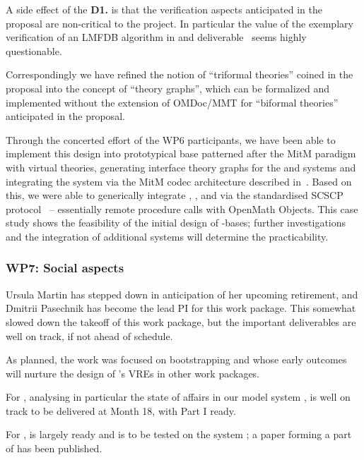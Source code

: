 \documentclass{deliverablereport}
\begin{document}
A side effect of the \textbf{D1.} is that the verification aspects anticipated in the
proposal are non-critical to the \pn project. In particular the value of the exemplary
verification of an LMFDB algorithm in  and
deliverable~ seems highly questionable. 

Correspondingly we have refined the notion of ``triformal theories'' coined in the
proposal into the concept of ``\DKS theory graphs'', which can be formalized and
implemented without the extension of OMDoc/MMT for ``biformal theories'' anticipated in
the proposal.

Through the concerted effort of the WP6 participants, we have been able to implement
this design into prototypical \DKS base patterned after the MitM paradigm with virtual
theories, generating interface theory graphs for the \GAP and \Sage systems and
integrating the \LMFDB system via the MitM codec architecture described
in~\cite{ODK-D6.2}. Based on this, we were able to generically integrate \GAP, \Sage, and
\LMFDB via the standardised SCSCP protocol~\cite{HorRoz:ossp09} -- essentially remote
procedure calls with OpenMath Objects. This case study shows the feasibility of the
initial design of \DKS-bases; further investigations and the integration of additional
systems will determine the practicability.

\subsubsection{WP7: Social aspects}

Ursula Martin has stepped down in anticipation of her upcoming retirement, and Dmitrii Pasechnik has
become the lead PI for this work package.
This somewhat slowed down the takeoff of this work package, but the
important deliverables are well on track, if not ahead of schedule.

As planned, the work was focused on bootstrapping
 and
 whose early
outcomes will nurture the design of \ODK's VREs in other work
packages.

For ,
 analysing in
particular the state of affairs in our model system \Sage, is well on
track to be delivered at Month 18, with Part I ready.

For ,
 is largely ready and is to
be tested on the system \Sage; a paper
\cite{Pavlou:2016:MCI:2936924.2936934} forming a part of
 has been published.
\end{document}
